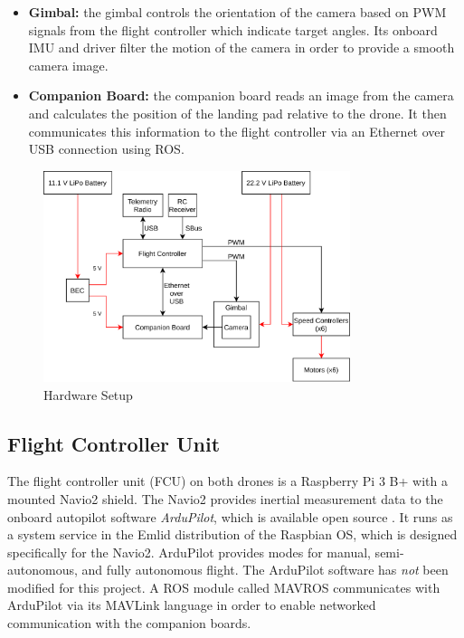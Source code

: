 \begin{itemize}
    \item \textbf{Gimbal:} the gimbal controls the orientation of the camera based on PWM signals from the flight controller which indicate target angles. Its onboard IMU and driver filter the motion of the camera in order to provide a smooth camera image.
    \item \textbf{Companion Board:} the companion board reads an image from the camera and calculates the position of the landing pad relative to the drone. It then communicates this information to the flight controller via an Ethernet over USB connection using ROS.
    
\end{itemize}

\begin{figure}
    \centering
    \includegraphics[width=0.8\textwidth]{images/hardware.png}
    \caption{Hardware Setup}
    \label{fig:hardware_setup}
\end{figure}

\subsection{Flight Controller Unit}

The flight controller unit (FCU) on both drones is a Raspberry Pi 3 B+ with a mounted Navio2 \cite{navio2_website} shield. The Navio2 provides inertial measurement data to the onboard autopilot software \textit{ArduPilot}, which is available open source \cite{ardupilot_website}. It runs as a system service in the Emlid distribution of the Raspbian OS, which is designed specifically for the Navio2. ArduPilot provides modes for manual, semi-autonomous, and fully autonomous flight. The ArduPilot software has \textit{not} been modified for this project. A ROS \cite{ros} module called MAVROS \cite{mavros} communicates with ArduPilot via its MAVLink \cite{mavlink_website} language in order to enable networked communication with the companion boards.

